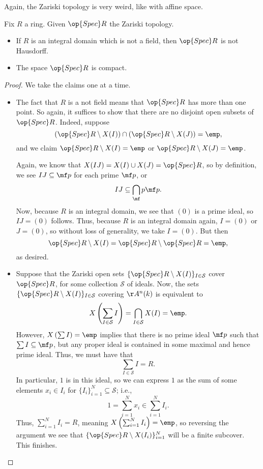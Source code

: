 Again, the Zariski topology is very weird, like with affine space.
\begin{proposition}
	Fix $R$ a ring. Given $\op{Spec}R$ the Zariski topology.
	\begin{itemize}
		\item If $R$ is an integral domain which is not a field, then $\op{Spec}R$ is not Hausdorff.
		\item The space $\op{Spec}R$ is compact.
	\end{itemize}
\end{proposition}
\begin{proof}
	We take the claims one at a time.
	\begin{itemize}
		\item The fact that $R$ is a not field means that $\op{Spec}R$ has more than one point. So again, it suffices to show that there are no disjoint open subsets of $\op{Spec}R$. Indeed, suppose
		\[(\op{Spec}R\setminus X(I))\cap(\op{Spec}R\setminus X(J))=\emp,\]
		and we claim $\op{Spec}R\setminus X(I)=\emp$ or $\op{Spec}R\setminus X(J)=\emp$.

		Again, we know that $X(IJ)=X(I)\cup X(J)=\op{Spec}R$, so by definition, we see $IJ\subseteq\mf p$ for each prime $\mf p$, or
		\[IJ\subseteq\bigcap_\mf p\mf p.\]
		Now, because $R$ is an integral domain, we see that $(0)$ is a prime ideal, so $IJ=(0)$ follows. Thus, because $R$ is an integral domain again, $I=(0)$ or $J=(0)$, so without loss of generality, we take $I=(0)$. But then
		\[\op{Spec}R\setminus X(I)=\op{Spec}R\setminus\op{Spec}R=\emp,\]
		as desired.

		\item Suppose that the Zariski open sets $\{\op{Spec}R\setminus X(I)\}_{I\in\mathcal S}$ cover $\op{Spec}R$, for some collection $\mathcal S$ of ideals. Now, the sets $\{\op{Spec}R\setminus X(I)\}_{I\in\mathcal S}$ covering $\AA^n(k)$ is equivalent to
		\[X\left(\sum_{I\in\mathcal S}I\right)=\bigcap_{I\in\mathcal S}X(I)=\emp.\]
		However, $X\left(\sum I\right)=\emp$ implies that there is no prime ideal $\mf p$ such that $\sum I\subseteq\mf p$, but any proper ideal is contained in some maximal and hence prime ideal. Thus, we must have that
		\[\sum_{I\in\mathcal S}I=R.\]
		In particular, $1$ is in this ideal, so we can express $1$ as the sum of some elements $x_i\in I_i$ for $\{I_i\}_{i=1}^N\subseteq\mathcal S$; i.e.,
		\[1=\sum_{i=1}^Nx_i\in\sum_{i=1}^NI_i.\]
		Thus, $\sum_{i=1}^NI_i=R$, meaning $X\left(\sum_{i=1}^NI_i\right)=\emp$, so reversing the argument we see that $\{\op{Spec}R\setminus X(I_i)\}_{i=1}^N$ will be a finite subcover. This finishes.
		\qedhere
	\end{itemize}
\end{proof}

